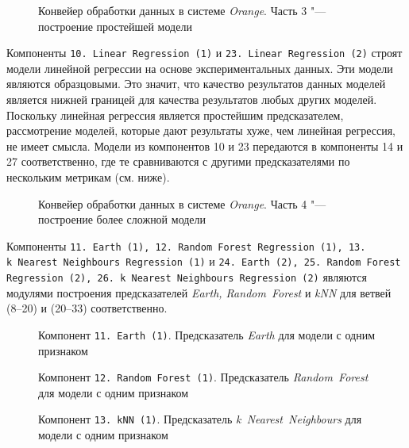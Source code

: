\begin{figure}[tbp]
    \caption{Конвейер обработки данных в системе \textit{Orange}. Часть 3 "--- построение простейшей модели}
    \label{img:series30-3}
\end{figure}

Компоненты \texttt{10.\,Linear~Regression~(1)} и \texttt{23.\,Linear~Regression~(2)} строят модели линейной регрессии на основе экспериментальных данных. Эти модели являются образцовыми. Это значит, что качество результатов данных моделей является нижней границей для качества результатов любых других моделей. Поскольку линейная регрессия является простейшим предсказателем, рассмотрение моделей, которые дают результаты хуже, чем линейная регрессия, не имеет смысла. Модели из компонентов 10 и 23 передаются в компоненты 14 и 27 соответственно, где те сравниваются с другими предсказателями по нескольким метрикам (см. ниже).

\begin{figure}[tbp]
    \caption{Конвейер обработки данных в системе \textit{Orange}. Часть 4 "--- построение более сложной модели}
    \label{img:series30-4}
\end{figure}

Компоненты \texttt{11.\,Earth~(1), 12.\,Random~Forest Regression~(1), 13.\,k~Nearest~Neighbours Regression~(1)} и \texttt{24.\,Earth~(2), 25.~Random~Forest Regression~(2), 26.\,k~Nearest~Neighbours Regression~(2)} являются модулями построения предсказателей \textit{Earth, Random~Forest} и \textit{kNN} для ветвей (8--20) и (20--33) соответственно.

\begin{figure}[tbp]
    \caption{Компонент \texttt{11.\,Earth~(1)}. Предсказатель \textit{Earth} для модели с одним признаком}
    \label{img:11-Earth-1}
\end{figure}

\begin{figure}[tbp]
    \center{\texttt{[image: 12-RF-1]}}
    \caption{Компонент \texttt{12.\,Random~Forest~(1)}. Предсказатель \textit{Random~Forest} для модели с одним признаком}
    \label{img:12-RF-1}
\end{figure}

\begin{figure}[tbp]
    \caption{Компонент \texttt{13.\,kNN~(1)}. Предсказатель \textit{k~Nearest~Neighbours} для модели с одним признаком}
    \label{img:13-kNN-1}
\end{figure}

